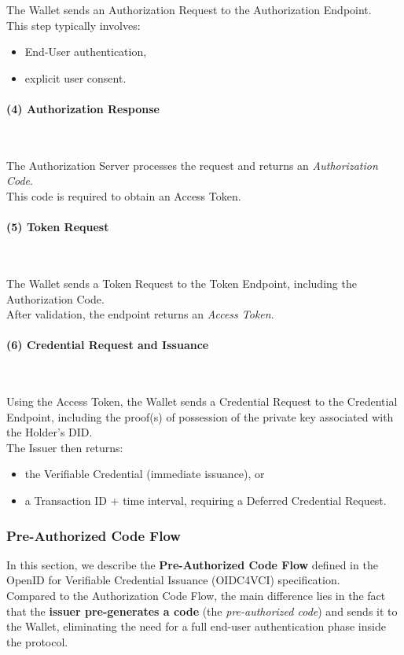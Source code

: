 \noindent
The Wallet sends an Authorization Request to the Authorization Endpoint.\\ 
This step typically involves:
\begin{itemize}
    \item End-User authentication,
    \item explicit user consent.
\end{itemize}

\paragraph{(4) Authorization Response} ~

\noindent
The Authorization Server processes the request and returns an \emph{Authorization Code}.\\
This code is required to obtain an Access Token.

\paragraph{(5) Token Request} ~

\noindent
The Wallet sends a Token Request to the Token Endpoint, including the Authorization Code.\\
After validation, the endpoint returns an \emph{Access Token}.

\paragraph{(6) Credential Request and Issuance} ~

\noindent
Using the Access Token, the Wallet sends a Credential Request to the Credential Endpoint, including the proof(s) of possession of the private key associated with the Holder's DID.\\
The Issuer then returns:
\begin{itemize}
    \item the Verifiable Credential (immediate issuance), or
    \item a Transaction ID + time interval, requiring a Deferred Credential Request.
\end{itemize}

\subsubsection{Pre-Authorized Code Flow}

In this section, we describe the \textbf{Pre-Authorized Code Flow} defined in the OpenID for Verifiable Credential Issuance (OIDC4VCI) specification.\\
Compared to the Authorization Code Flow, the main difference lies in the fact that the \textbf{issuer pre-generates a code} (the \emph{pre-authorized code}) and sends it to the Wallet, eliminating the need for a full end-user authentication phase inside the protocol.  
\medskip  

